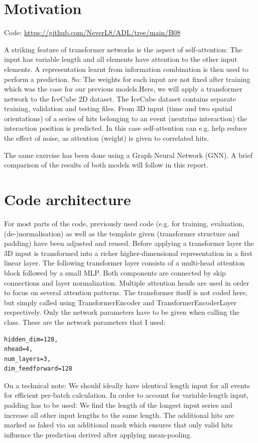 \chapter{Motivation}\label{blabli}
Code: \url{https://github.com/NeverL8/ADL/tree/main/B08}
\vspace{0.75cm}\newline

A striking feature of transformer networks is the aspect of self-attention: The input has variable length and all elements have attention to the other input elements.
A representation learnt from information combination is then used to perform a prediction.
So: The weights for each input are not fixed after training which was the case for our previous models.Here, we will apply a transformer network to the IceCube 2D dataset.
The IceCube dataset contains separate training, validation and testing files. From 3D input (time and two spatial orientations) of a series of hits belonging
to an event (neutrino interaction) the interaction position is predicted. In this case self-attention can e.g. help reduce the effect of noise, as attention (weight) is given to correlated hits.

The same exercise has been done using a Graph Neural Network (GNN). A brief comparison of the results of both models will follow in this report.
\chapter{Code architecture}
For most parts of the code, previously used code (e.g. for training, evaluation, (de-)normalisation) as well as the template given (transformer structure and padding) have been adjusted and reused.
Before applying a transformer layer the 3D input is transformed into a richer higher-dimensional representation in a first linear layer.
The following transformer layer consists of a multi-head attention block followed by a small MLP.
Both components are connected by skip connections and layer normalization.
Multiple attention heads are used in order to focus on several attention patterns.
The transformer itself is not coded here, but simply called using TransformerEncoder and TransformerEncoderLayer respectively.
Only the network parameters have to be given when calling the class. These are the network parameters that I used:
\begin{verbatim}
hidden_dim=128,
nhead=4,          
num_layers=3,    
dim_feedforward=128
\end{verbatim}
On a technical note: We should ideally have identical length input for all events for efficient per-batch calculation. In order to account for variable-length input, padding has to be used: We find the length of the longest input series and increase
all other input lengths to the same length. The additional hits are marked as faked via an additional mask which 
ensures that only valid hits influence the prediction derived after applying mean-pooling.

